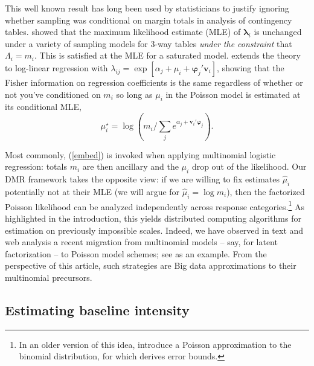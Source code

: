 \documentclass[12pt]{article}
\newcommand{\bs}[1]{\boldsymbol{#1}}
\newcommand{\bm}[1]{\mathbf{#1}}
\begin{document}
This well known result has long been used by statisticians to justify ignoring
whether sampling was conditional on margin totals in analysis of contingency
tables. \cite{birch_maximum_1963} showed that the maximum likelihood estimate
(MLE) of $\bs{\lambda}_i$ is unchanged under a variety of sampling models for
3-way tables {\it under the constraint} that $\Lambda_{i} = m_i$. This is
satisfied at the MLE for a saturated model. \cite{palmgren_fisher_1981}
extends the theory to log-linear regression with $\lambda_{ij} = \exp[\alpha_j
+ \mu_i + \bs{\varphi}_j'\bm{v}_i]$, showing that the Fisher information on
  regression coefficients is the same regardless of whether or not you've
  conditioned on $m_i$  so long as $\mu_i$ in the Poisson model is estimated
  at its conditional MLE, 
 \begin{equation} \label{mlemu}
  \mu_i^\star =
\log\left(m_i/\sum_j e^{\alpha_j + \bm{v}_i'\bs{\varphi}_j}\right).  
\end{equation}

Most commonly, (\ref{embed}) is invoked when applying multinomial logistic
regression: totals $m_i$ are then ancillary and the $\mu_i$ drop out of the
likelihood.  Our DMR framework takes the opposite view: if we are willing to
fix estimates $\hat\mu_i$ potentially not at their MLE (we will argue for
$\hat\mu_i = \log m_i$), then the factorized Poisson likelihood can be
analyzed independently across response categories.\footnote{In an older version
of this idea, \cite{hodges_poisson_1960} introduce a Poisson approximation
to the binomial distribution, for which
\cite{mcdonald_poisson_1980} derives error bounds.} As
highlighted in the introduction, this yields distributed computing algorithms
for estimation on previously impossible scales.  Indeed, we have observed in
text and web analysis a recent migration from multinomial models -- say, for
latent factorization -- to Poisson model schemes; see
\citet{gopalan_scalable_2013} as an example.  From the perspective of this
article, such strategies are Big data approximations to their
multinomial precursors.


\subsection{Estimating baseline intensity}
\label{MU}
\end{document}

